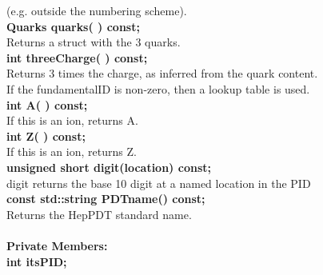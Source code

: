 \begin{tabbing}
                (e.g. outside the numbering scheme). \\
\hspace{0.5in}  {\bf Quarks quarks( ) const; }\\
\hspace{1.0in}  Returns a struct with the 3 quarks. \\
\hspace{0.5in}  {\bf int threeCharge( ) const; }\\
\hspace{1.0in}  Returns 3 times the charge, as inferred from the quark content.\\
\hspace{1.0in}  If the fundamentalID is non-zero, then a lookup table is used. \\
\hspace{0.5in}  {\bf int A( ) const; }\\
\hspace{1.0in}  If this is an ion, returns A.\\
\hspace{0.5in}  {\bf int Z( ) const; }\\
\hspace{1.0in}  If this is an ion, returns Z.\\
\hspace{0.5in}  {\bf unsigned short digit(location) const; }\\
\hspace{1.0in}  digit returns the base 10 digit at a named location in the PID \\
\hspace{0.5in}  {\bf const std::string PDTname() const; }\\
\hspace{1.0in}  Returns the HepPDT standard name. \\ \\

{\bf Private Members:} \\
\hspace{0.5in}  {\bf int itsPID; } \\

\end{tabbing}

\vfill\eject

